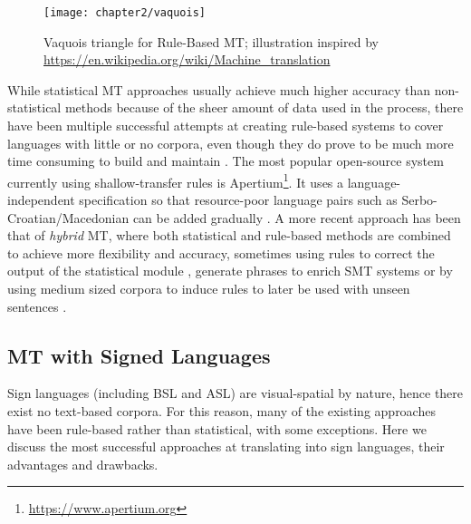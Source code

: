 \documentclass[12pt]{ociamthesis}  %
\begin{document}
\begin{figure}[h]
	\centering
    \texttt{[image: chapter2/vaquois]}
    \caption[Vaquois triangle for Rule-Based MT]{Vaquois triangle for Rule-Based MT; illustration inspired by \url{https://en.wikipedia.org/wiki/Machine_translation}}
    \label{fig:vaquois}
\end{figure}
While statistical MT approaches usually achieve much higher accuracy than non-statistical methods because of the sheer amount of data used in the process, there have been multiple successful attempts at creating rule-based systems to cover languages with little or no corpora, even though they do prove to be much more time consuming to build and maintain . The most popular open-source system currently using shallow-transfer rules is Apertium\footnote{\url{https://www.apertium.org}}. It uses a language-independent specification so that resource-poor language pairs such as Serbo-Croatian/Macedonian can be added gradually . A more recent approach has been that of \textit{hybrid} MT, where both statistical and rule-based methods are combined to achieve more flexibility and accuracy, sometimes using rules to correct the output of the statistical module , generate phrases to enrich SMT systems  or by using medium sized corpora to induce rules to later be used with unseen sentences  .

\subsection{MT with Signed Languages}
\label{existing methods}
Sign languages (including BSL and ASL) are visual-spatial by nature, hence there exist no text-based corpora. For this reason, many of the existing approaches have been rule-based rather than statistical, with some exceptions. Here we discuss the most successful approaches at translating into sign languages, their advantages and drawbacks. \\
\end{document}
